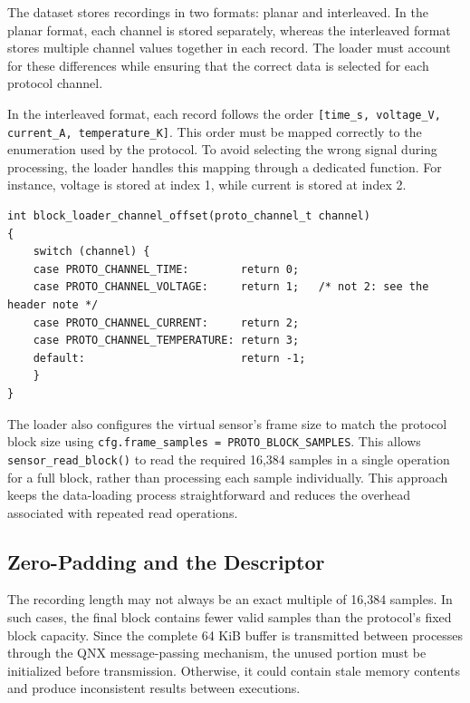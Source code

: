 \documentclass[12pt,a4paper,oneside]{report}
\begin{document}
The dataset stores recordings in two formats: planar and interleaved. In the planar format, each channel is stored separately, whereas the interleaved format stores multiple channel values together in each record. The loader must account for these differences while ensuring that the correct data is selected for each protocol channel.

In the interleaved format, each record follows the order \texttt{[time\_s, voltage\_V, current\_A, temperature\_K]}. This order must be mapped correctly to the enumeration used by the protocol. To avoid selecting the wrong signal during processing, the loader handles this mapping through a dedicated function. For instance, voltage is stored at index 1, while current is stored at index 2.

\begin{lstlisting}[caption={Mapping protocol channels to interleaved file offsets using \texttt{block\_loader\_channel\_offset}}, label={lst:loader-offset}]
int block_loader_channel_offset(proto_channel_t channel)
{
    switch (channel) {
    case PROTO_CHANNEL_TIME:        return 0;
    case PROTO_CHANNEL_VOLTAGE:     return 1;   /* not 2: see the header note */
    case PROTO_CHANNEL_CURRENT:     return 2;
    case PROTO_CHANNEL_TEMPERATURE: return 3;
    default:                        return -1;
    }
}
\end{lstlisting}

The loader also configures the virtual sensor's frame size to match the protocol block size using \texttt{cfg.frame\_samples = PROTO\_BLOCK\_SAMPLES}. This allows \texttt{sensor\_read\_block()} to read the required 16,384 samples in a single operation for a full block, rather than processing each sample individually. This approach keeps the data-loading process straightforward and reduces the overhead associated with repeated read operations.


\subsection{Zero-Padding and the Descriptor}

The recording length may not always be an exact multiple of 16,384 samples. In such cases, the final block contains fewer valid samples than the protocol's fixed block capacity. Since the complete 64 KiB buffer is transmitted between processes through the QNX message-passing mechanism, the unused portion must be initialized before transmission. Otherwise, it could contain stale memory contents and produce inconsistent results between executions.
\end{document}

